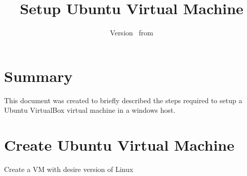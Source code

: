 \documentclass{scrartcl}
\newcommand{\docTitle}{Setup Ubuntu Virtual Machine}
\begin{document}
\title{\docTitle}
\author{\vhListAllAuthors}
\date{Version \vhCurrentVersion\ from \vhCurrentDate}
\maketitle

\section{Summary}
This document was created to briefly described the steps required to setup a Ubuntu VirtualBox virtual machine in a windows host.




\section{Create Ubuntu Virtual Machine}
\label{sec:create_vm}

Create a VM with desire version of Linux 
\end{document}
